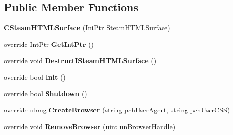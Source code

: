 \subsection*{Public Member Functions}
\begin{DoxyCompactItemize}
\item 
\hypertarget{classValve_1_1Steamworks_1_1CSteamHTMLSurface_a6c52fbdf24d53d43fc446a68e87a95b7}{}{\bfseries C\+Steam\+H\+T\+M\+L\+Surface} (Int\+Ptr Steam\+H\+T\+M\+L\+Surface)\label{classValve_1_1Steamworks_1_1CSteamHTMLSurface_a6c52fbdf24d53d43fc446a68e87a95b7}

\item 
\hypertarget{classValve_1_1Steamworks_1_1CSteamHTMLSurface_a5cb63b7ee19c83c99a10310a644f3aed}{}override Int\+Ptr {\bfseries Get\+Int\+Ptr} ()\label{classValve_1_1Steamworks_1_1CSteamHTMLSurface_a5cb63b7ee19c83c99a10310a644f3aed}

\item 
\hypertarget{classValve_1_1Steamworks_1_1CSteamHTMLSurface_ad86a49213ced2c8767cd711debf882ca}{}override \hyperlink{SDL__audio_8h_a52835ae37c4bb905b903cbaf5d04b05f}{void} {\bfseries Destruct\+I\+Steam\+H\+T\+M\+L\+Surface} ()\label{classValve_1_1Steamworks_1_1CSteamHTMLSurface_ad86a49213ced2c8767cd711debf882ca}

\item 
\hypertarget{classValve_1_1Steamworks_1_1CSteamHTMLSurface_ad3d1ef49cfe00b83cc1bd00572d9171f}{}override bool {\bfseries Init} ()\label{classValve_1_1Steamworks_1_1CSteamHTMLSurface_ad3d1ef49cfe00b83cc1bd00572d9171f}

\item 
\hypertarget{classValve_1_1Steamworks_1_1CSteamHTMLSurface_aef920fced8141d600901a396f980617f}{}override bool {\bfseries Shutdown} ()\label{classValve_1_1Steamworks_1_1CSteamHTMLSurface_aef920fced8141d600901a396f980617f}

\item 
\hypertarget{classValve_1_1Steamworks_1_1CSteamHTMLSurface_a69c9f2a1866e42786eeebc8e9381dd18}{}override ulong {\bfseries Create\+Browser} (string pch\+User\+Agent, string pch\+User\+C\+S\+S)\label{classValve_1_1Steamworks_1_1CSteamHTMLSurface_a69c9f2a1866e42786eeebc8e9381dd18}

\item 
\hypertarget{classValve_1_1Steamworks_1_1CSteamHTMLSurface_a23c4716b5fbde708be4dfbb6f7d09d7f}{}override \hyperlink{SDL__audio_8h_a52835ae37c4bb905b903cbaf5d04b05f}{void} {\bfseries Remove\+Browser} (uint un\+Browser\+Handle)\label{classValve_1_1Steamworks_1_1CSteamHTMLSurface_a23c4716b5fbde708be4dfbb6f7d09d7f}


\end{DoxyCompactItemize}

